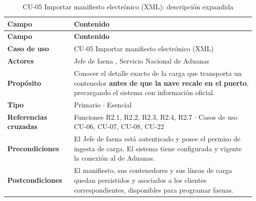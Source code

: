 {\estilotabla
\begin{longtable}{L{0.25\textwidth} L{0.69\textwidth}}

\caption{CU-05 Importar manifiesto electrónico (XML): descripción expandida}
\label{tab:cu05_desc}
\\

\toprule
\textbf{Campo} & \textbf{Contenido} \\
\midrule
\endfirsthead

\toprule
\textbf{Campo} & \textbf{Contenido} \\
\midrule
\endhead

\textbf{Caso de uso} & CU-05 Importar manifiesto electrónico (XML) \\
\midrule
\textbf{Actores} & Jefe de faena , Servicio Nacional de Aduanas
 \\
\midrule
\textbf{Propósito} & Conocer el detalle exacto de la carga que transporta un contenedor
\textbf{antes de que la nave recale en el puerto}, precargando el sistema con información
oficial. \\
\midrule
\textbf{Tipo} & Primario $\cdot$ Esencial \\
\midrule
\textbf{Referencias cruzadas} & Funciones R2.1, R2.2, R2.3, R2.4, R2.7 $\cdot$
Casos de uso CU-06, CU-07, CU-08, CU-22 \\
\midrule
\textbf{Precondiciones} & El Jefe de faena está autenticado y posee el permiso de ingesta de carga.
El sistema tiene configurada y vigente la conexión al  de Aduanas. \\
\midrule
\textbf{Postcondiciones} & El manifiesto, sus contenedores y sus líneas de carga quedan persistidos
y asociados a los clientes correspondientes, disponibles para programar faenas. \\

\bottomrule

\end{longtable}
}

